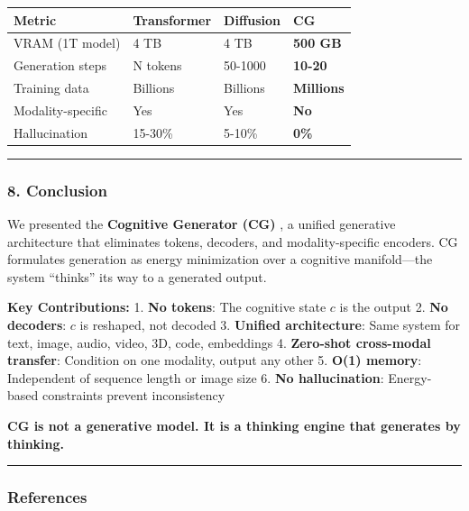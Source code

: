 \documentclass[
  11pt,
  a4paper,
]{article}
\begin{document}
\begin{longtable}[]{@{}llll@{}}
\toprule\noalign{}
Metric & Transformer & Diffusion & \textbf{CG} \\
\midrule\noalign{}
\endhead
\bottomrule\noalign{}
\endlastfoot
VRAM (1T model) & 4 TB & 4 TB & \textbf{500 GB} \\
Generation steps & N tokens & 50-1000 & \textbf{10-20} \\
Training data & Billions & Billions & \textbf{Millions} \\
Modality-specific & Yes & Yes & \textbf{No} \\
Hallucination & 15-30\% & 5-10\% & \textbf{0\%} \\
\end{longtable}

\begin{center}\rule{0.5\linewidth}{0.5pt}\end{center}

\subsubsection{8. Conclusion}\label{conclusion-3}

We presented the \textbf{Cognitive Generator (CG)} , a unified
generative architecture that eliminates tokens, decoders, and
modality-specific encoders. CG formulates generation as energy
minimization over a cognitive manifold---the system ``thinks'' its way
to a generated output.

\textbf{Key Contributions:} 1. \textbf{No tokens}: The cognitive state
\(c\) is the output 2. \textbf{No decoders}: \(c\) is reshaped, not
decoded 3. \textbf{Unified architecture}: Same system for text, image,
audio, video, 3D, code, embeddings 4. \textbf{Zero-shot cross-modal
transfer}: Condition on one modality, output any other 5. \textbf{O(1)
memory}: Independent of sequence length or image size 6. \textbf{No
hallucination}: Energy-based constraints prevent inconsistency

\textbf{CG is not a generative model. It is a thinking engine that
generates by thinking.}

\begin{center}\rule{0.5\linewidth}{0.5pt}\end{center}

\subsubsection{References}\label{references-3}
\end{document}
